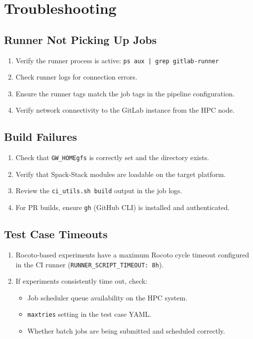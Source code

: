 \documentclass[11pt,letterpaper,twoside]{article}
\begin{document}
\section{Troubleshooting}
\label{sec:troubleshooting}

\subsection{Runner Not Picking Up Jobs}

\begin{enumerate}[leftmargin=1.5em]
  \item Verify the runner process is active:
    \texttt{ps aux | grep gitlab-runner}
  \item Check runner logs for connection errors.
  \item Ensure the runner tags match the job tags in the pipeline configuration.
  \item Verify network connectivity to the GitLab instance from the HPC node.
\end{enumerate}

\subsection{Build Failures}

\begin{enumerate}[leftmargin=1.5em]
  \item Check that \texttt{GW\_HOMEgfs} is correctly set and the directory exists.
  \item Verify that Spack-Stack modules are loadable on the target platform.
  \item Review the \texttt{ci\_utils.sh build} output in the job logs.
  \item For PR builds, ensure \texttt{gh} (GitHub CLI) is installed and
    authenticated.
\end{enumerate}

\subsection{Test Case Timeouts}

\begin{enumerate}[leftmargin=1.5em]
  \item Rocoto-based experiments have a maximum Rocoto cycle timeout configured
    in the CI runner (\texttt{RUNNER\_SCRIPT\_TIMEOUT: 8h}).
  \item If experiments consistently time out, check:
    \begin{itemize}
      \item Job scheduler queue availability on the HPC system.
      \item \texttt{maxtries} setting in the test case YAML.
      \item Whether batch jobs are being submitted and scheduled correctly.
    \end{itemize}
\end{enumerate}
\end{document}
